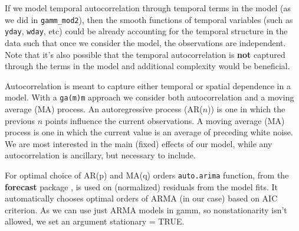 \documentclass[
]{book}
\newenvironment{Shaded}{\begin{snugshade}}{\end{snugshade}}
\newcommand{\AttributeTok}[1]{\textcolor[rgb]{0.77,0.63,0.00}{#1}}
\newcommand{\CommentTok}[1]{\textcolor[rgb]{0.56,0.35,0.01}{\textit{#1}}}
\newcommand{\ConstantTok}[1]{\textcolor[rgb]{0.00,0.00,0.00}{#1}}
\newcommand{\DocumentationTok}[1]{\textcolor[rgb]{0.56,0.35,0.01}{\textbf{\textit{#1}}}}
\newcommand{\FunctionTok}[1]{\textcolor[rgb]{0.00,0.00,0.00}{#1}}
\newcommand{\NormalTok}[1]{#1}
\newcommand{\OtherTok}[1]{\textcolor[rgb]{0.56,0.35,0.01}{#1}}
\newcommand{\SpecialCharTok}[1]{\textcolor[rgb]{0.00,0.00,0.00}{#1}}
\newcommand{\StringTok}[1]{\textcolor[rgb]{0.31,0.60,0.02}{#1}}
\begin{document}
If we model temporal autocorrelation through temporal terms in the model (as we did in \texttt{gamm\_mod2}), then the smooth functions of temporal variables (such as \texttt{yday}, \texttt{wday}, etc) could be already accounting for the temporal structure in the data such that once we consider the model, the observations are independent. Note that it's also possible that the temporal autocorrelation is \textbf{not} captured through the terms in the model and additional complexity would be beneficial.

Autocorrelation is meant to capture either temporal or spatial dependence in a model. With a \texttt{ga(m)m} approach we consider both autocorrelation and a moving average (MA) process. An autoregressive process (AR(\(n\))) is one in which the previous \(n\) points influence the current observations. A moving average (MA) process is one in which the current value is an average of preceding white noise. We are most interested in the main (fixed) effects of our model, while any autocorrelation is ancillary, but necessary to include.

For optimal choice of AR(p) and MA(q) orders \texttt{auto.arima} function, from the \textbf{forecast} package \citep[\citet{R-forecast2}]{R-forecast}, is used on (normalized) residuals from the model fits. It automatically chooses optimal orders of ARMA (in our case) based on AIC criterion. As we can use just ARMA models in gamm, so nonstationarity isn't allowed, we set an argument stationary = TRUE.

\begin{Shaded}
\end{Shaded}
\end{document}
